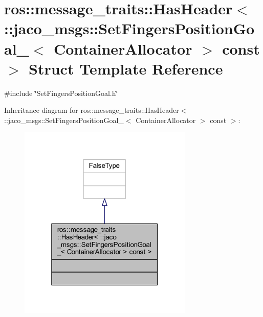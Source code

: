 \hypertarget{structros_1_1message__traits_1_1HasHeader_3_01_1_1jaco__msgs_1_1SetFingersPositionGoal___3_01Con6003a1317d2bf6774871b870a173bdcc}{}\section{ros\+:\+:message\+\_\+traits\+:\+:Has\+Header$<$ \+:\+:jaco\+\_\+msgs\+:\+:Set\+Fingers\+Position\+Goal\+\_\+$<$ Container\+Allocator $>$ const $>$ Struct Template Reference}
\label{structros_1_1message__traits_1_1HasHeader_3_01_1_1jaco__msgs_1_1SetFingersPositionGoal___3_01Con6003a1317d2bf6774871b870a173bdcc}


{\ttfamily \#include \char`\"{}Set\+Fingers\+Position\+Goal.\+h\char`\"{}}



Inheritance diagram for ros\+:\+:message\+\_\+traits\+:\+:Has\+Header$<$ \+:\+:jaco\+\_\+msgs\+:\+:Set\+Fingers\+Position\+Goal\+\_\+$<$ Container\+Allocator $>$ const $>$\+:
\nopagebreak
\begin{figure}[H]
\begin{center}
\leavevmode
\includegraphics[width=235pt]{dd/d3f/structros_1_1message__traits_1_1HasHeader_3_01_1_1jaco__msgs_1_1SetFingersPositionGoal___3_01Con555de109ccf3ccabc24cdd3fd7a8e998}
\end{center}
\end{figure}


